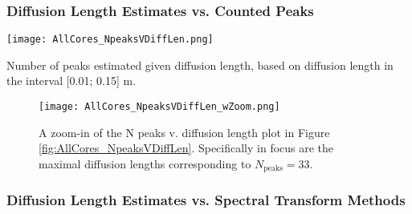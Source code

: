 \documentclass[../../CompleteThesis2/Complete_2ndDraft]{subfiles}
\begin{document}
\subsubsection[Diffusion Length V N Peaks]{Diffusion Length Estimates vs. Counted Peaks}
\label{Subsubsec:Results_DiffLenEst_AlphabetCores_DiffLenVPeaks}
\begin{marginfigure}
	\centering
	\texttt{[image: AllCores\_NpeaksVDiffLen.png]}
	\caption[$\sigma$ vs. N Peaks]{\footnotesize Number of peaks estimated given diffusion length, based on diffusion length in the interval [0.01; 0.15] m.}
	\label{fig:AllCores_NpeaksVDiffLen}
\end{marginfigure}

\begin{figure}[h]
	\centering
	\texttt{[image: AllCores\_NpeaksVDiffLen\_wZoom.png]}
	\caption[$\sigma$ vs. N Peaks]{\small A zoom-in of the N peaks v. diffusion length plot in Figure \ref{fig:AllCores_NpeaksVDiffLen}. Specifically in focus are the maximal diffusion lengths corresponding to $N_{\text{peaks}}=33$.}
	\label{fig:AllCores_NpeaksVDiffLenZoom}
\end{figure}


\subsubsection[$\sigma$ v. Spectral Transforms]{Diffusion Length Estimates vs. Spectral Transform Methods}
\label{Subsubsec:Results_DiffLenEst_AlphabetCores_SpectralTransforms}
\end{document}
